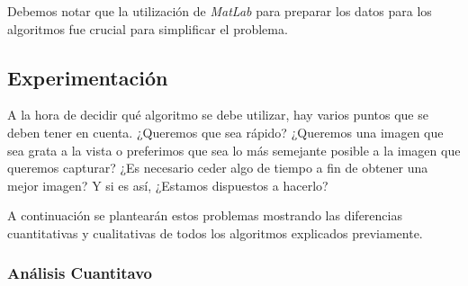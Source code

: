 \vspace{\baselineskip}

Debemos notar que la utilización de \textit{MatLab} para preparar los datos para los algoritmos fue crucial para simplificar el problema.
	
\newpage
\subsection{Experimentación}

A la hora de decidir qué algoritmo se debe utilizar, hay varios puntos que se deben tener en cuenta. ¿Queremos que sea rápido? ¿Queremos una imagen que sea grata a la vista o preferimos que sea lo más semejante posible a la imagen que queremos capturar? ¿Es necesario ceder algo de tiempo a fin de obtener una mejor imagen? Y si es así, ¿Estamos dispuestos a hacerlo? 

\vspace{\baselineskip}

A continuación se plantearán estos problemas mostrando las diferencias cuantitativas y cualitativas de todos los algoritmos explicados previamente.

\subsubsection{Análisis Cuantitavo}

